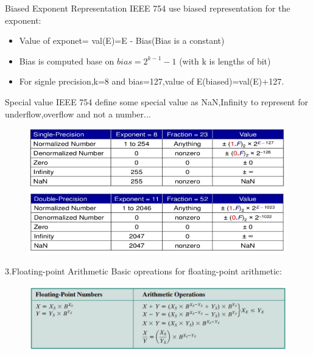 \documentclass[11pt]{beamer}
\begin{document}
\begin{frame}[t]{Biased Exponent Representation}
IEEE 754 use biased representation for the exponent:
\begin{itemize}
\item Value of exponet= val(E)=E - Bias(Bias is a constant)
\item Bias is computed base on $bias=2^{k-1}-1$ (with k is lengths of bit)
\item For signle precision,k=8 and bias=127,value of E(biased)=val(E)+127.
\end{itemize}
\end{frame}
\begin{frame}[t]{Special value}
IEEE 754 define some special value as NaN,Infinity to represent for underflow,overflow and not a number...\begin{center}
    \begin{figure}[htp]
    \begin{center}
     \includegraphics[scale=.5]{image/fig25}
    \end{center}
    \label{reffig25}
    \end{figure}
\end{center}

\end{frame}
\begin{frame}[t]{3.Floating-point Arithmetic}
Basic opreations for floating-point arithmetic:
\begin{center}
    \begin{figure}[htp]
    \begin{center}
     \includegraphics[scale=.5]{image/fig26}
    \end{center}
    \label{reffig26}
    \end{figure}
\end{center}
\end{frame}
\end{document}
